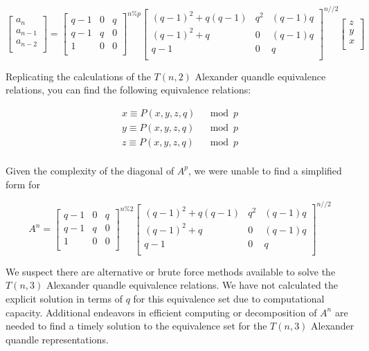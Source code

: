 \documentclass[paper.tex]{subfiles}
\begin{document}
\[
\left[ \begin{array}{ccc}
a_{n} \\
a_{n-1} \\
a_{n-2} \\
\end{array} \right]
=
\left[ \begin{array}{ccc}
q-1 & 0 & q \\
q-1 & q & 0 \\
1 & 0 & 0 \\
\end{array} \right] ^{n\%p}
\left[ \begin{array}{ccc}
(q-1)^{2} + q(q-1) & q^{2} & (q-1)q \\
(q-1)^{2} + q & 0 & (q-1)q \\
q-1 & 0 & q \\
\end{array} \right] ^{n//2}
\left[ \begin{array}{ccc}
z \\
y \\
x \\
\end{array} \right]
\]

Replicating the calculations of the $T(n,2)$ Alexander quandle equivalence relations, you can find the following equivalence relations:

\begin{align*}
	x \equiv P(x,y,z,q) & \mod{p} \\
	y \equiv P(x,y,z,q) & \mod{p} \\
	z \equiv P(x,y,z,q) & \mod{p} \\
\end{align*}

Given the complexity of the diagonal of $A^{p}$, we were unable to find a simplified form for

\[ A^{n}
=
\left[ \begin{array}{ccc}
q-1 & 0 & q \\
q-1 & q & 0 \\
1 & 0 & 0 \\
\end{array} \right] ^{n\%2}
\left[ \begin{array}{ccc}
(q-1)^{2} + q(q-1) & q^{2} & (q-1)q \\
(q-1)^{2} + q & 0 & (q-1)q \\
q-1 & 0 & q \\
\end{array} \right] ^{n//2}
\]

We suspect there are alternative or brute force methods available to solve the $T(n,3)$ Alexander quandle equivalence relations.  We have not calculated the explicit solution in terms of $q$ for this equivalence set due to computational capacity. Additional endeavors in efficient computing or decomposition of $A^{n}$ are needed to find a timely solution to the equivalence set for the $T(n,3)$ Alexander quandle representations.
\end{document}
